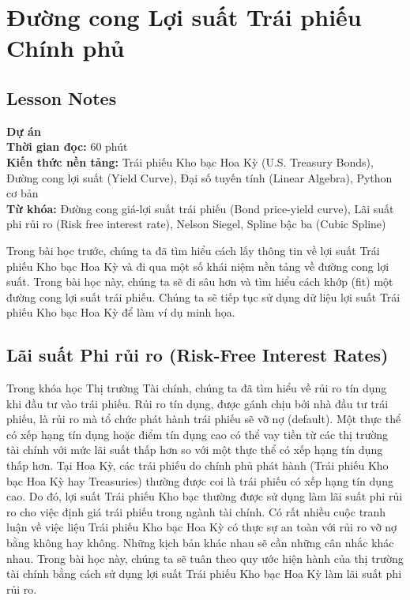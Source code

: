 \chapter{Đường cong Lợi suất Trái phiếu Chính phủ}
\label{ch:M1L3}

\section*{Lesson Notes}

\textbf{Dự án} \\
\textbf{Thời gian đọc:} 60 phút \\
\textbf{Kiến thức nền tảng:} Trái phiếu Kho bạc Hoa Kỳ (U.S. Treasury Bonds), Đường cong lợi suất (Yield Curve), Đại số tuyến tính (Linear Algebra), Python cơ bản \\
\textbf{Từ khóa:} Đường cong giá-lợi suất trái phiếu (Bond price-yield curve), Lãi suất phi rủi ro (Risk free interest rate), Nelson Siegel, Spline bậc ba (Cubic Spline)

Trong bài học trước, chúng ta đã tìm hiểu cách lấy thông tin về lợi suất Trái phiếu Kho bạc Hoa Kỳ và đi qua một số khái niệm nền tảng về đường cong lợi suất. Trong bài học này, chúng ta sẽ đi sâu hơn và tìm hiểu cách khớp (fit) một đường cong lợi suất trái phiếu. Chúng ta sẽ tiếp tục sử dụng dữ liệu lợi suất Trái phiếu Kho bạc Hoa Kỳ để làm ví dụ minh họa.

\section[Lãi suất Phi rủi ro]{Lãi suất Phi rủi ro (Risk-Free Interest Rates)}

Trong khóa học Thị trường Tài chính, chúng ta đã tìm hiểu về rủi ro tín dụng khi đầu tư vào trái phiếu. Rủi ro tín dụng, được gánh chịu bởi nhà đầu tư trái phiếu, là rủi ro mà tổ chức phát hành trái phiếu sẽ vỡ nợ (default). Một thực thể có xếp hạng tín dụng hoặc điểm tín dụng cao có thể vay tiền từ các thị trường tài chính với mức lãi suất thấp hơn so với một thực thể có xếp hạng tín dụng thấp hơn. Tại Hoa Kỳ, các trái phiếu do chính phủ phát hành (Trái phiếu Kho bạc Hoa Kỳ hay Treasuries) thường được coi là trái phiếu có xếp hạng tín dụng cao. Do đó, lợi suất Trái phiếu Kho bạc thường được sử dụng làm lãi suất phi rủi ro cho việc định giá trái phiếu trong ngành tài chính. Có rất nhiều cuộc tranh luận về việc liệu Trái phiếu Kho bạc Hoa Kỳ có thực sự an toàn với rủi ro vỡ nợ bằng không hay không. Những kịch bản khác nhau sẽ cần những cân nhắc khác nhau. Trong bài học này, chúng ta sẽ tuân theo quy ước hiện hành của thị trường tài chính bằng cách sử dụng lợi suất Trái phiếu Kho bạc Hoa Kỳ làm lãi suất phi rủi ro.

